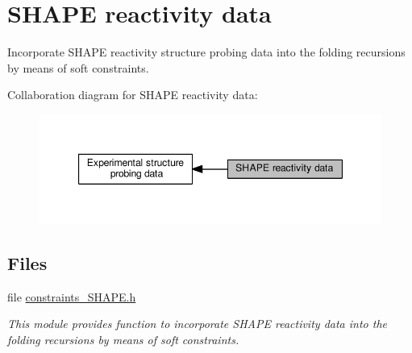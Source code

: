 \hypertarget{group__SHAPE__reactivities}{}\section{S\+H\+A\+PE reactivity data}
\label{group__SHAPE__reactivities}


Incorporate S\+H\+A\+PE reactivity structure probing data into the folding recursions by means of soft constraints.  


Collaboration diagram for S\+H\+A\+PE reactivity data\+:
\nopagebreak
\begin{figure}[H]
\begin{center}
\leavevmode
\includegraphics[width=347pt]{group__SHAPE__reactivities}
\end{center}
\end{figure}
\subsection*{Files}
\begin{DoxyCompactItemize}
\item 
file \hyperlink{constraints__SHAPE_8h}{constraints\+\_\+\+S\+H\+A\+P\+E.\+h}
\begin{DoxyCompactList}\small\item\em This module provides function to incorporate S\+H\+A\+PE reactivity data into the folding recursions by means of soft constraints. \end{DoxyCompactList}\end{DoxyCompactItemize}
